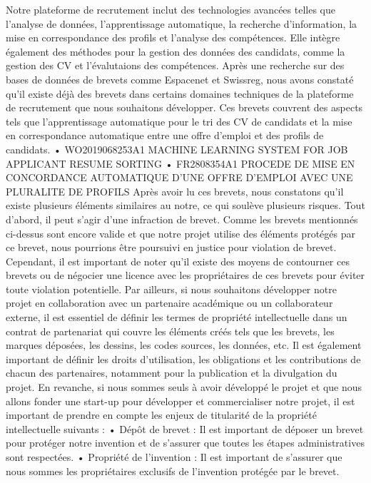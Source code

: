  \begin{itemize}
    Notre plateforme de recrutement inclut des technologies avancées telles que l’analyse de données, l’apprentissage automatique, la recherche d’information, la mise en correspondance des profils et l’analyse des compétences. Elle intègre également des méthodes pour la gestion des données des candidats, comme la gestion des CV et l’évalutaions des compétences.
 Après une recherche sur des bases de données de brevets comme Espacenet et Swissreg, nous avons constaté qu'il existe déjà des brevets dans certains domaines techniques de la plateforme de recrutement que nous souhaitons développer. Ces brevets couvrent des aspects tels que l'apprentissage automatique pour le tri des CV de candidats et la mise en correspondance automatique entre une offre d'emploi et des profils de candidats.
 •	WO2019068253A1 MACHINE LEARNING SYSTEM FOR JOB APPLICANT RESUME SORTING
 •	FR2808354A1 PROCEDE DE MISE EN CONCORDANCE AUTOMATIQUE D'UNE OFFRE D'EMPLOI AVEC UNE PLURALITE DE PROFILS
 Après avoir lu ces brevets, nous constatons qu’il existe plusieurs éléments similaires au notre, ce qui soulève plusieurs risques.
 Tout d’abord, il peut s’agir d’une infraction de brevet. Comme les brevets mentionnés ci-dessus sont encore valide et que notre projet utilise des éléments protégés par ce brevet, nous pourrions être poursuivi en justice pour violation de brevet. 
 Cependant, il est important de noter qu'il existe des moyens de contourner ces brevets ou de négocier une licence avec les propriétaires de ces brevets pour éviter toute violation potentielle. 
 Par ailleurs, si nous souhaitons développer notre projet en collaboration avec un partenaire académique ou un collaborateur externe, il est essentiel de définir les termes de propriété intellectuelle dans un contrat de partenariat qui couvre les éléments créés tels que les brevets, les marques déposées, les dessins, les codes sources, les données, etc. Il est également important de définir les droits d'utilisation, les obligations et les contributions de chacun des partenaires, notamment pour la publication et la divulgation du projet.
 En revanche, si nous sommes seuls à avoir développé le projet et que nous allons fonder une start-up pour développer et commercialiser notre projet, il est important de prendre en compte les enjeux de titularité de la propriété intellectuelle suivants :
 •	Dépôt de brevet : Il est important de déposer un brevet pour protéger notre invention et de s'assurer que toutes les étapes administratives sont respectées.
 •	Propriété de l'invention : Il est important de s'assurer que nous sommes les propriétaires exclusifs de l'invention protégée par le brevet.

\end{itemize}
